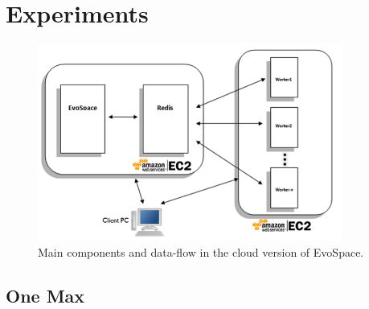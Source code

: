 \documentclass{llncs}
\begin{document}
\section{Experiments}

\begin{figure}[t]
    \centering
        \includegraphics[width=10cm]{img/evospace-aws.png}
    \caption{Main components and data-flow in the cloud version of EvoSpace. }
    \label{fig:evospace}
\end{figure}

\subsection{One Max}
\end{document}
